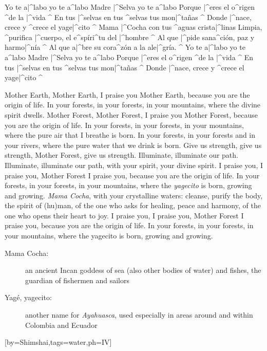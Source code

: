 \beginchorus{}
    Yo te a|^labo yo te a^labo Madre |^Selva yo te a^labo
    Porque |^eres el o^rigen ^de la |^vida ^
  \endchorus\glueverses\beginchorus{}
    En tus |^selvas en tus ^selvas tus mon|^tañas ^
    Donde |^nace, crece y ^crece el yage|^cito ^
  \endchorus
  \beginchorus{}
    Mama |^Cocha con tus ^aguas crista|^linas
    Limpia, ^purifica |^cuerpo, el e^spíri^tu del |^hombre ^
  \endchorus\glueverses\beginchorus{}
    Al que |^pide sana^ción, paz y harmo|^nía ^
    Al que a|^bre su cora^zón a la ale|^gría. ^
  \endchorus
  \beginchorus{}
    Yo te a|^labo yo te a^labo Madre |^Selva yo te a^labo
    Porque |^eres el o^rigen ^de la |^vida ^
  \endchorus\glueverses\beginchorus{}
    En tus |^selvas en tus ^selvas tus mon|^tañas ^
    Donde |^nace, crece y ^crece el yage|^cito ^
  \endchorus
  \begin{translation}
    Mother Earth, Mother Earth, I praise you Mother Earth,
    because you are the origin of life.
    In your forests, in your forests, in your mountains,
    where the divine spirit dwells.
    \nextverse
    Mother Forest, Mother Forest, I praise you Mother Forest,
    because you are the origin of life.
    In your forests, in your forests, in your mountains,
    where the pure air that I breathe is born.
    In your forests, in your forests and in your rivers,
    where the pure water that we drink is born.
    \nextverse
    Give us strength, give us strength, Mother Forest, give us strength.
    Illuminate, illuminate our path.
    Illuminate, illuminate our path,
    with your spirit, your divine spirit.
    \nextverse
    I praise you, I praise you, Mother Forest I praise you,
    because you are the origin of life.
    In your forests, in your forests, in your mountains,
    where the \emph{yagecito} is born, growing and growing.
    \nextverse
    \emph{Mama Cocha}, with your crystalline waters:
    cleanse, purify the body, the spirit of (hu)man,
    of the one who asks for healing, peace and harmony,
    of the one who opens their heart to joy.
    \nextverse
    I praise you, I praise you, Mother Forest I praise you,
    because you are the origin of life.
    In your forests, in your forests, in your mountains,
    where the yagecito is born, growing and growing.
  \end{translation}
  \begin{explanation}
    \begin{description}
      \item[Mama Cocha:] an ancient Incan goddess of sea (also other bodies of water) and fishes,
        the guardian of fishermen and sailors
      \item[Yagé, yagecito:] another name for \emph{Ayahuasca}, used especially in areas around
        and within Colombia and Ecuador
    \end{description}
  \end{explanation}
\endsong


[by={Shimshai},tags={water},ph={IV}]
  \beginchorus\memorize %
    \]\]\]\]\]\]\]\]\]\]\]\]\]\]\]\]\]\]\]\]\]\]\]\]\]\]\]\]\]\]\]\]\]\]\]\]\]\]\]\]\]\]\]\]\]\]\]\]\]\]\]\]\]\]\]\]\]\]\]\]\]\]\]\]\]\]\]\]\]\]\]\]\]\]\]\]\]\]\]\]\]\]\]\]\]\]\]\]\]\]\]\]\]\]\]\]\]\]\]\]\]\]\]\]\]\]\]\]\]\]\]\]\]\]\]\]\]\]\]\]\]\]\]\]\]\]\]\]\]\]\]\]\]\]\]\]\]\]\]\]\]\]\]\]\]\]\]\]\]\]\]\]\]\]\]\]\]\]\]\]\]\]\]\]\]\]\]\]\]\]\]\]\]\]\]\]\]\]\]\]\]\]\]\]\]\]\]\]\]\]\]\]\]\]\]\]\]\]\]\]\]\]\]\]\]\]\]\]\]\]\]\]\]\]\]\]\]\]\]\]\]\]\]\]\]\]\]\]\]\]\]\]\]\]\]\]\]\]\]\]\]\]\]\]\]\]\]\]\]\]\]\]\]\]\]\]\]\]\]\]\]\]\]\]\]\]\]\]\]\]\]\]\]\]\]\]\]\]\]\]\]\]\]\]\]\]\]\]\]\]\]\]\]\]\]\]\]\]\]\]\]\]\]\]\]\]\]\]\]\]\]\]\]\]\]\]\]\]\]\]\]\]\]\]\]\]\]\]\]\]\]\]\]\]\]\]\]\]\]\]\]\]\]\]\]\]\]\]\]\]\]\]\]\]\]\]\]\]\]\]\]\]\]\]\]\]\]\]\]\]\]\]\]\]\]\]\]\]\]\]\]\]\]\]\]\]\]\]\]\]\]\]\]\]\]\]\]\]\]\]\]\]\]\]\]\]\]\]\]\]\]\]\]\]\]\]\]\]\]\]\]\]\]\]\]\]\]\]\]\]\]\]\]\]\]\]\]\]\]\]\]\]\]\]\]\]\]\]\]\]\]\]\]\]\]\]\]\]\]\]\]\]\]\]\]\]\]\]\]\]\]\]\]\]\]\]\]\]\]\]\]\]\]\]\]\]\]\]\]\]\]\]\]\]\]\]\]\]\]\]\]\]\]\]\]\]\]\]\]\]\]\]\]\]\]\]\]\]\]\]\]\]\]\]\]\]\]\]\]\]\]\]\]\]\]\]\]\]\]\]\]\]\]\]\]\]\]\]\]\]\]\]\]\]\]\]\]\]\]\]\]\]\]\]\]\]\]\]\]\]\]\]\]\]\]\]\]\]\]\]\]\]\]\]\]\]\]\]\]\]\]\]\]\]\]\]\]\]\]\]\]\]\]\]\]\]\]\]\]\]\]\]\]\]\]\]\]\]\]\]\]\]\]\]\]\]\]\]\]\]\]\]\]\]\]\]\]\]\]\]\]\]\]\]\]\]\]\]\]\]\]\]\]\]\]\]\]\]\]\]\]\]\]\]\]\]\]\]\]\]\]\]\]\]\]\]\]\]\]\]\]\]\]\]\]\]\]\]\]\]\]\]\]\]\]\]\]\]\]\]\]\]\]\]\]\]\]\]\]\]\]\]\]\]\]\]\]\]\]\]\]\]\]\]\]\]\]\]\]\]\]\]\]\]\]\]\]\]\]\]\]\]\]\]\]\]\]\]\]\]\]\]\]\]\]\]\]\]\]\]\]\]\]\]\]\]\]\]\]\]\]\]\]\]\]\]\]\]\]\]\]\]\]\]\]\]\]\]\]\]\]\]\]\]\]\]\]\]\]\]\]\]\]\]\]\]\]\]\]\]\]\]\]\]\]\]\]\]\]\]\]\]\]\]\]\]\]\]\]\]\]\]\]\]\]\]\]\]\]\]\]\]\]\]\]\]\]\]\]\]\]\]\]\]\]\]\]\]\]\]\]\]\]\]\]\]\]\]\]\]\]\]\]\]\]\]\]\]\]\]\]\]\]\]\]\]\]\]\]\]\]\]\]\]\]\]\]\]\]\]\]\]\]\]\]\]\]\]\]\]\]\]\]\]\]\]\]\]\]\]\]\]\]\]\]\]\]\]\]\]\]\]\]\]\]\]\]\]\]\]\]\]\]\]\]\]\]\]\]\]\]\]\]\]\]\]\]\]\]\]\]\]\]\]\]\]\]\]\]\]\]\]\]\]\]\]\]\]\]\]\]\]\]\]\]\]\]\]\]\]\]\]\]\]\]\]\]\]\]\]\]\]\]\]\]\]\]\]\]\]\]\]\]\]\]\]\]\]\]\]\]\]\]\]\]\]\]\]\]\]\]\]\]\]\]\]\]\]\]\]\]\]\]\]\]\]\]\]\]\]\]\]\]\]\]\]\]\]\]\]\]\]\]\]\]\]\]\]\]\]\]\]\]\]\]\]\]\]\]\]\]\]\]\]\]\]\]\]\]\]\]\]\]\]\]\]\]\]\]\]\]\]\]\]\]\]\]\]\]\]\]\]\]\]\]\]\]\]\]\]\]\]\]\]\]\]\]\]\]\]\]\]\]\]\]\]\]\]\]\]\]\]\]\]\]\]\]\]\]\]\]\]\]\]\]\]\]\]\]\]\]\]\]\]\]\]\]\]\]\]\]\]\]\]\]\]\]\]\]\]\]\]\]\]\]\]\]\]\]\]\]\]\]\]\]\]\]\]\]\]\]\]\]\]\]\]\]\]\]\]\]\]\]\]\]\]\]\]\]\]\]\]\]\]\]\]\]\]\]\]\]\]\]\]\]\]\]\]\]\]\]\]\]\]\]\]\]\]\]\]\]\]\]\]\]\]\]\]\]\]\]\]\]\]\]\]\]\]\]\]
